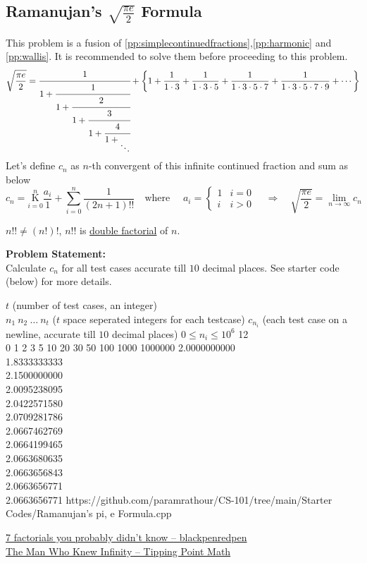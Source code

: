 \documentclass[../../Problems]{subfiles}
\begin{document}
\subsection{Ramanujan's $\sqrt{\frac{\pi e}{2}}$ Formula}{\label{pp:ramanujanpieformula}}
This problem is a fusion of \ref{pp:simplecontinuedfractions},\ref{pp:harmonic} and \ref{pp:wallis}. It is recommended to solve them before proceeding to this problem.
\begin{equation}
 \sqrt{\frac{\pi e}{2}}=\cfrac{1}{1+{\cfrac {1}{1+{\cfrac {2}{1+{\cfrac {3}{1+{{\cfrac{4}{1+{_{\ddots }}} }}}}}}}}} + \left\{1 + \frac{1}{1\cdot3}+\frac{1}{1\cdot3\cdot5}+\frac{1}{1\cdot3\cdot5\cdot7}+\frac{1}{1\cdot3\cdot5\cdot7\cdot9}+\cdots\right\}
\end{equation}
Let's define $c_n$ as $n$-th convergent of this infinite continued fraction and sum as below
\begin{equation*}
c_n={\underset {i=0}{\overset {n }{\mathrm {K} }}}{\frac {a_i}{1}} + \sum_{i = 0}^n \frac{1}{(2n+1)!!} \quad\text{where }\quad a_i = \begin{cases} 
      1 & i = 0 \\
      i & i > 0
   \end{cases}\quad\Rightarrow\quad  \sqrt{\frac{\pi e}{2}} = \lim_{n\rightarrow\infty}c_n
\end{equation*}
\begin{note}
$n!! \neq (n!)!$, $n!!$ is \href{https://en.wikipedia.org/wiki/Double_factorial}{double factorial} of $n$.
\end{note}
\textbf{Problem Statement:}\\
Calculate $c_n$ for all test cases accurate till $10$ decimal places. See starter code (below) for more details.
\begin{testcases}
	{$t$ \hfill(number of test cases, an integer)\\$n_1\ n_2\ \ldots\ n_t$ \hfill($t$ space seperated integers for each testcase)}
	{$c_{n_i}$ \hfill(each test case on a newline, accurate till $10$ decimal places)}
	{$0 \leq n_i \leq 10^{6}$}
	{12\\0 1 2 3 5 10 20 30 50 100 1000 1000000}
	{2.0000000000\\1.8333333333\\2.1500000000\\2.0095238095\\2.0422571580\\2.0709281786\\2.0667462769\\2.0664199465\\2.0663680635\\2.0663656843\\2.0663656771\\2.0663656771}
	{https://github.com/paramrathour/CS-101/tree/main/Starter Codes/Ramanujan's pi, e Formula.cpp}
\end{testcases}
\begin{funvideo}
\href{https://youtu.be/7eboFOkRHr4}{7 factorials you probably didn't know -- blackpenredpen}
\\\href{https://youtu.be/P0idBBhGNgU}{The Man Who Knew Infinity -- Tipping Point Math}
\end{funvideo}
\end{document}
